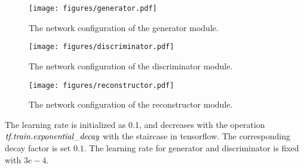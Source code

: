 \documentclass{article}
\begin{document}
\begin{figure}[h]
\begin{center}
\texttt{[image: figures/generator.pdf]}
\caption{The network configuration of the generator module.}
\label{fig:generator}
\end{center}
\end{figure}
\begin{figure}[ht]
\begin{center}
\texttt{[image: figures/discriminator.pdf]}
\caption{The network configuration of the discriminator module.}
\label{fig:discriminator}
\end{center}
\end{figure}
\begin{figure}[ht]
\begin{center}
\texttt{[image: figures/reconstructor.pdf]}
\caption{The network configuration of the reconstructor module.}
\label{fig:reconstructor}
\end{center}
\end{figure}
The learning rate is initialized as 0.1, and decreases with the operation $\emph{tf.train.exponential\_decay}$ with the staircase in tensorflow. The corresponding decay factor is set $0.1$. The learning rate for generator and discriminator is fixed with $3e-4$.
\end{document}

